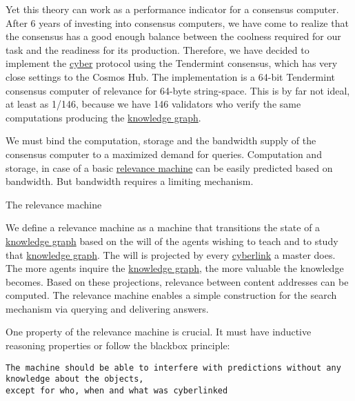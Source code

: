 \documentclass[8pt,oneside]{amsart}
\makeatletter
\newcommand{\linkred}[2]{\href{#1}{\color{red}{#2}}}
\newcommand{\linkgreen}[2]{\href{#1}{\color{green}{#2}}}
\renewcommand\subsection{\@startsection{subsection}
                                    {2}{\z@}
                                    {-3.25ex\@plus -1ex \@minus -.2ex}
                                    {0ex \@plus .2ex}
                                    {\play\Large}
                        }
\newcommand{\titleSection}[1]{\subsection{#1}}
\makeatother
\begin{document}
Yet this theory can work as a performance indicator for a consensus computer. After 6 years of investing into consensus computers, we have come to realize that the \linkgreen{https://ipfs.io/ipfs/QmaMtD7xDgghqgjN62zWZ5TBGFiEjGQtuZBjJ9sMh816KJ}{Tendermint} consensus has a good enough balance between the coolness required for our task and the readiness for its production. Therefore, we have decided to implement the {\hyperref[cyber]{cyber}} protocol using the Tendermint consensus, which has very close settings to the Cosmos Hub. The \linkred{https://github.com/cybercongress/go-cyber}{go-cyber} implementation is a 64-bit Tendermint consensus computer of relevance for 64-byte string-space. This is by far not ideal, at least as 1/146, because we have 146 validators who verify the same computations producing the {\hyperref[knowledge-graph]{knowledge graph}}.

We must bind the computation, storage and the bandwidth supply of the consensus computer to a maximized demand for queries. Computation and storage, in case of a basic {\hyperref[relevance-machine]{relevance machine}} can be easily predicted based on bandwidth. But bandwidth requires a limiting mechanism.

\titleSection{The relevance machine}\label{relevance-machine}

We define a relevance machine as a machine that transitions the state of a {\hyperref[knowledge-graph]{knowledge graph}} based on the will of the agents wishing to teach and to study that {\hyperref[knowledge-graph]{knowledge graph}}. The will is projected by every {\hyperref[cyberlinks]{cyberlink}} a master does. The more agents inquire the {\hyperref[knowledge-graph]{knowledge graph}}, the more valuable the knowledge becomes. Based on these projections, relevance between content addresses can be computed. The relevance machine enables a simple construction for the search mechanism via querying and delivering answers.

One property of the relevance machine is crucial. It must have inductive reasoning properties or follow the blackbox principle:

\begin{lstlisting}
The machine should be able to interfere with predictions without any knowledge about the objects,
except for who, when and what was cyberlinked
\end{lstlisting}
\end{document}
